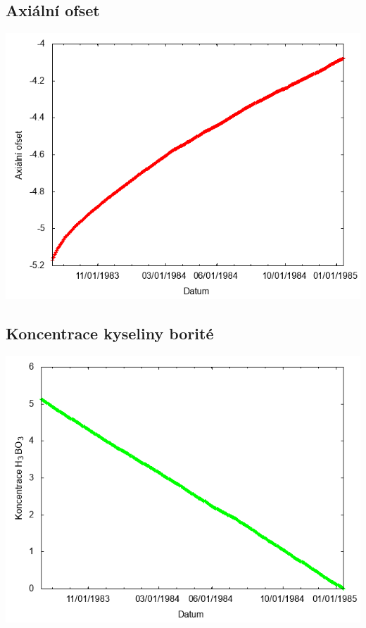 \documentclass[a4paper,twoside,11pt]{article}
\begin{document}
\subsection*{Axiální ofset}
\begin{center}
\includegraphics[width=.8\textwidth]{graphs/Disneyland_13_ao.png}
\end{center}

\subsection*{Koncentrace kyseliny borité}
\begin{center}
\includegraphics[width=.8\textwidth]{graphs/Disneyland_13_bc.png}
\end{center}
\end{document}

